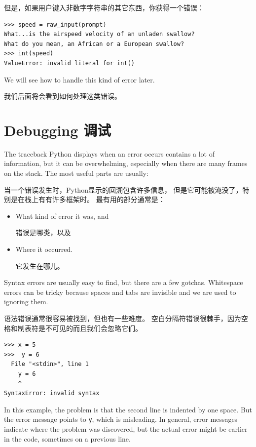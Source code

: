 \documentclass[10pt]{book}
\begin{document}
\begin{CJK}{UTF8}{gbsn}
但是，如果用户键入非数字字符串的其它东西，你获得一个错误：

\begin{verbatim}
>>> speed = raw_input(prompt)
What...is the airspeed velocity of an unladen swallow?
What do you mean, an African or a European swallow?
>>> int(speed)
ValueError: invalid literal for int()
\end{verbatim}
%
We will see how to handle this kind of error later.

我们后面将会看到如何处理这类错误。

\section{Debugging 调试}
\label{whitespace}

The traceback Python displays when an error occurs contains
a lot of information, but it can be overwhelming, especially
when there are many frames on the stack.  The most
useful parts are usually:

当一个错误发生时，Python显示的回溯包含许多信息，
但是它可能被淹没了，特别是在栈上有有许多框架时。
最有用的部分通常是：

\begin{itemize}

\item What kind of error it was, and

错误是哪类，以及

\item Where it occurred.

它发生在哪儿。

\end{itemize}

Syntax errors are usually easy to find, but there are a few
gotchas.  Whitespace errors can be tricky because spaces and
tabs are invisible and we are used to ignoring them.

语法错误通常很容易被找到，但也有一些难度。
空白分隔符错误很棘手，因为空格和制表符是不可见的而且我们会忽略它们。

\begin{verbatim}
>>> x = 5
>>>  y = 6
  File "<stdin>", line 1
    y = 6
    ^
SyntaxError: invalid syntax
\end{verbatim}
%
In this example, the problem is that the second line is indented by
one space.  But the error message points to {\tt y}, which is
misleading.  In general, error messages indicate where the problem was
discovered, but the actual error might be earlier in the code,
sometimes on a previous line.


\end{CJK}
\end{document}
